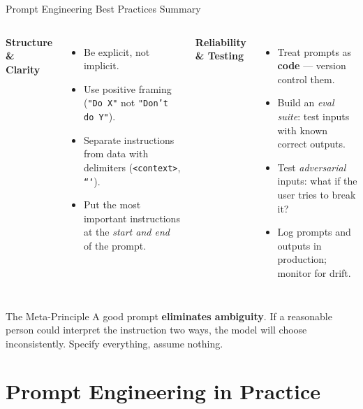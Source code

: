 \documentclass{beamer}
\begin{document}
\begin{frame}{Prompt Engineering Best Practices Summary}
    \begin{columns}
        \textbf{Structure \& Clarity}
        \begin{itemize}
            \item Be explicit, not implicit.
            \item Use positive framing (\texttt{"Do X"} not \texttt{"Don't do Y"}).
            \item Separate instructions from data with delimiters (\texttt{<context>}, \texttt{```}).
            \item Put the most important instructions at the \emph{start and end} of the prompt.
        \end{itemize}

        \textbf{Reliability \& Testing}
        \begin{itemize}
            \item Treat prompts as \textbf{code} --- version control them.
            \item Build an \emph{eval suite}: test inputs with known correct outputs.
            \item Test \emph{adversarial} inputs: what if the user tries to break it?
            \item Log prompts and outputs in production; monitor for drift.
        \end{itemize}
    \end{columns}

    \vspace{0.3cm}
    \begin{alertblock}{The Meta-Principle}
        A good prompt \textbf{eliminates ambiguity}. If a reasonable person could
        interpret the instruction two ways, the model will choose inconsistently.
        Specify everything, assume nothing.
    \end{alertblock}
\end{frame}

\section{Prompt Engineering in Practice}
\end{document}

